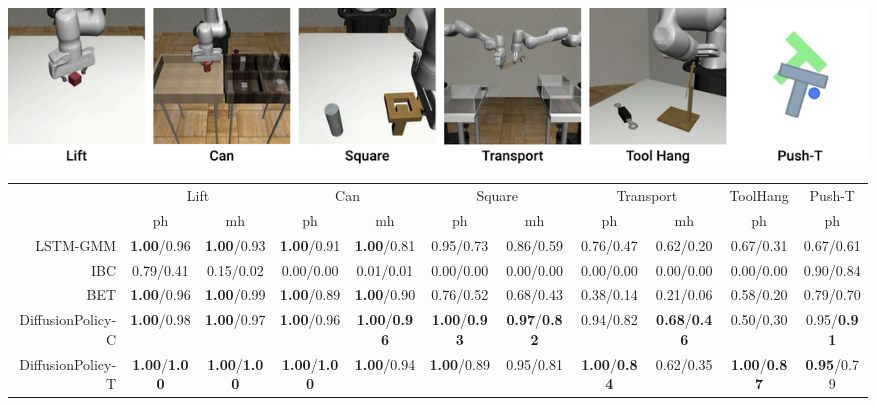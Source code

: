 \documentclass[Afour,sageh,times]{sagej}
\begin{document}
\begin{table}[h]

~~~~~~~~~~~~~~~~~~~~~~~~~~~~~~~~~~~~
\includegraphics[width=0.835\linewidth]{figure/sim_task_thumbnails.pdf}
\label{tab:sim_benchmark_state}

\vspace{1mm}
{
\centering




\setlength\tabcolsep{ 3 pt}
\begin{tabular}{r|cc|cc|cc|cc|c|c}
\toprule
 & \multicolumn{2}{c|}{Lift} & \multicolumn{2}{c|}{Can} & \multicolumn{2}{c|}{Square} & \multicolumn{2}{c|}{Transport} & \multicolumn{1}{c|}{ToolHang} & \multicolumn{1}{c}{Push-T} \\
 & ph & mh & ph & mh & ph & mh & ph & mh & ph & ph \\
\midrule
LSTM-GMM & \small \textbf{1.00}/0.96 & \small \textbf{1.00}/0.93 & \small \textbf{1.00}/0.91 & \small \textbf{1.00}/0.81 & \small 0.95/0.73 & \small 0.86/0.59 & \small 0.76/0.47 & \small 0.62/0.20 & \small 0.67/0.31 & \small 0.67/0.61 \\
IBC & \small 0.79/0.41 & \small 0.15/0.02 & \small 0.00/0.00 & \small 0.01/0.01 & \small 0.00/0.00 & \small 0.00/0.00 & \small 0.00/0.00 & \small 0.00/0.00 & \small 0.00/0.00 & \small 0.90/0.84 \\
BET & \small \textbf{1.00}/0.96 & \small \textbf{1.00}/0.99 & \small \textbf{1.00}/0.89 & \small \textbf{1.00}/0.90 & \small 0.76/0.52 & \small 0.68/0.43 & \small 0.38/0.14 & \small 0.21/0.06 & \small 0.58/0.20 & \small 0.79/0.70 \\
\midrule
DiffusionPolicy-C & \small \textbf{1.00}/0.98 & \small \textbf{1.00}/0.97 & \small \textbf{1.00}/0.96 & \small \textbf{1.00}/\textbf{0.96} & \small \textbf{1.00}/\textbf{0.93} & \small \textbf{0.97}/\textbf{0.82} & \small 0.94/0.82 & \small \textbf{0.68}/\textbf{0.46} & \small 0.50/0.30 & \small 0.95/\textbf{0.91} \\
DiffusionPolicy-T & \small \textbf{1.00}/\textbf{1.00} & \small \textbf{1.00}/\textbf{1.00} & \small \textbf{1.00}/\textbf{1.00} & \small \textbf{1.00}/0.94 & \small \textbf{1.00}/0.89 & \small 0.95/0.81 & \small \textbf{1.00}/\textbf{0.84} & \small 0.62/0.35 & \small \textbf{1.00}/\textbf{0.87} & \small \textbf{0.95}/0.79 \\
\bottomrule
\end{tabular}


}
\end{table}
\end{document}
